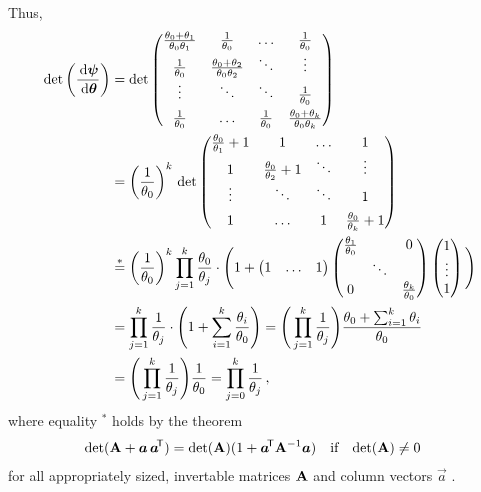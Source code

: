 \allowdisplaybreaks
Thus,
\begin{align*}
\det\left(\frac{\,\mathrm{d}\boldsymbol{\psi}}{\,\mathrm{d}\boldsymbol{\theta}}\right)
&= \det \begin{pmatrix}\frac{\theta_0 + \theta_1}{\theta_0 \theta_1} & \frac{1}{\theta_0} & \hdots & \frac{1}{\theta_0} \\
                       \frac{1}{\theta_0} & \frac{\theta_0 + \theta_2}{\theta_0 \theta_2} & \ddots & \vdots \\
                       \vdots & \ddots & \ddots & \frac{1}{\theta_0} \\[1ex]
                       \frac{1}{\theta_0} & \hdots & \frac{1}{\theta_0} & \frac{\theta_0 + \theta_k}{\theta_0 \theta_k}
        \end{pmatrix} \\
&= \left(\frac{1}{\theta_0}\right)^k\, \det
        \begin{pmatrix}\frac{\theta_0}{\theta_1} + 1 & 1 & \hdots & 1 \\
                       1 & \frac{\theta_0 }{\theta_2} + 1 & \ddots & \vdots \\
                       \vdots & \ddots & \ddots & 1 \\[1ex]
                       1 & \hdots & 1 & \frac{\theta_0}{\theta_k} + 1
        \end{pmatrix} \\
&\stackrel{*}{=} \left(\frac{1}{\theta_0}\right)^k \prod_{j=1}^k \frac{\theta_0}{\theta_j}
                 \cdot \Bigg( 1 + \begin{pmatrix}1 & \hdots & 1\end{pmatrix}
                                  \begin{pmatrix}\frac{\theta_1}{\theta_0} &  & 0 \\
                                                  & \ddots & \\
                                                 0 & & \frac{\theta_k}{\theta_0}\end{pmatrix}
                                  \begin{pmatrix}1 \\ \vdots\\ 1\end{pmatrix}\Bigg)\\
&= \prod_{j=1}^k \frac{1}{\theta_j} \cdot \Bigg( 1 + \sum_{i=1}^k \frac{\theta_i}{\theta_0} \Bigg)
 = \Bigg( \prod_{j=1}^k \frac{1}{\theta_j}\Bigg) \frac{ \theta_0 + \sum_{i=1}^k \theta_i}{\theta_0}\\
&= \Bigg( \prod_{j=1}^k \frac{1}{\theta_j}\Bigg) \frac{1}{\theta_0}
 = \prod_{j=0}^k \frac{1}{\theta_j}\,,
\end{align*}
where equality ${}^*$ holds by the theorem 
\begin{align*}
\det (\mathbf{A} + {\bm a}\, {\bm a}^{{\mbox{\!\scriptsize\textsf{T}}}}) &= \det(\mathbf{A}) (1+{\bm a}^{{\mbox{\!\scriptsize\textsf{T}}}} \mathbf{A}^{-1} {\bm a}) & \text{if}& & \det(\mathbf{A}) &\neq 0
\end{align*}
for all appropriately sized, invertable matrices $\mathbf{A}$ and column vectors $\vec{a}$
\parencite[Theorem A 16 (x), Appendix A3, p.~494]{MR2370506}.

